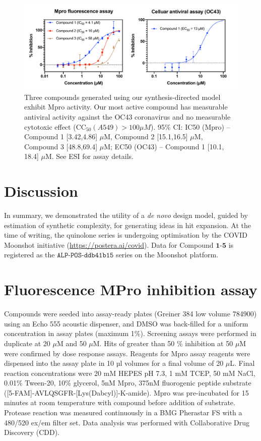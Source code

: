 \begin{figure}
\centering
         \includegraphics[scale=0.36]{Chapters/Ranking/Figs/data_curve.pdf}
    \caption{Three compounds generated using our synthesis-directed model exhibit Mpro activity. Our most active compound has measurable antiviral activity against the OC43 coronavirus and no measurable cytotoxic effect ($\mathrm{CC}_{50} (A549)>100 \mu M$). 95\% CI: IC50 (Mpro) -- Compound 1 [3.42,4.86] $\mu$M, Compound 2 [15.1,16.5] $\mu$M, Compound 3 [48.8,69.4] $\mu$M; EC50 (OC43) -- Compound 1 [10.1, 18.4] $\mu$M. See ESI for assay details.}
    \label{fig:data}
\end{figure}

\section{Discussion} \label{sec:discussion}

In summary, we demonstrated the utility of a \emph{de novo} design model, guided by estimation of synthetic complexity, for generating ideas in hit expansion. At the time of writing, the quinolone series is undergoing optimisation by the COVID Moonshot initiative (\url{https://postera.ai/covid}). Data for Compound $\mathbf{1}$-$\mathbf{5}$ is registered as the $\texttt{ALP-POS-ddb41b15}$ series on the Moonshot platform. 

\section{Fluorescence MPro inhibition assay}

Compounds were seeded into assay-ready plates (Greiner 384 low volume 784900) using an Echo 555 acoustic dispenser, and DMSO was back-filled for a uniform concentration in assay plates (maximum 1\%). Screening assays were performed in duplicate at 20 $\mu$M and 50 $\mu$M. Hits of greater than 50 \% inhibition at 50 $\mu$M were confirmed by dose response assays. Reagents for Mpro assay reagents were dispensed into the assay plate in 10 µl volumes for a final volume of 20 $\mu$L. 
Final reaction concentrations were 20 mM HEPES pH 7.3, 1 mM TCEP, 50 mM NaCl, 0.01\% Tween-20, 10\% glycerol, 5nM Mpro, 375nM fluorogenic peptide substrate ([5-FAM]-AVLQSGFR-[Lys(Dabcyl)]-K-amide). 
Mpro was pre-incubated for 15 minutes at room temperature with compound before addition of substrate. Protease reaction was measured continuously in a BMG Pherastar FS with a 480/520 ex/em filter set. Data analysis was performed with Collaborative Drug Discovery (CDD).


